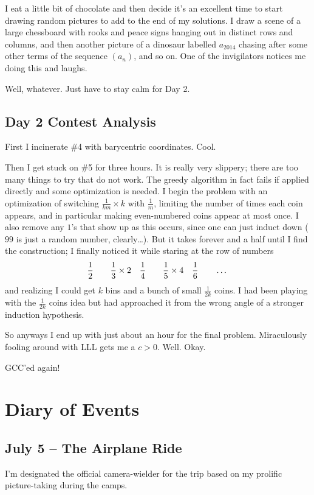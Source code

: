 \documentclass[11pt]{scrreprt}
\numberwithin{figure}{chapter}
\begin{document}
I eat a little bit of chocolate and then decide it's an excellent time to start drawing random pictures to add to the end of my solutions.
I draw a scene of a large chessboard with rooks and peace signs hanging out in distinct rows and columns, and then another picture of a dinosaur labelled $a_{2014}$ chasing after some other terms of the sequence $(a_n)$, and so on.
One of the invigilators notices me doing this and laughs.

Well, whatever. Just have to stay calm for Day 2.

\section{Day 2 Contest Analysis}
First I incinerate \#4 with barycentric coordinates.  Cool.

Then I get stuck on \#5 for three hours. It is really very slippery; there are too many things to try that do not work.
The greedy algorithm in fact fails if applied directly and some optimization is needed.
I begin the problem with an optimization of switching $\frac{1}{km} \times k$ with $\frac{1}{m}$, limiting the number of times each coin appears,
and in particular making even-numbered coins appear at most once.
I also remove any $1$'s that show up as this occurs, since one can just induct down ($99$ is just a random number, clearly\dots).
But it takes forever and a half until I find the construction; I finally noticed it while staring at the row of numbers
\[ \frac{1}{2} \qquad \frac 13 \times 2 \quad \frac 14 \qquad \frac 15 \times 4 \quad \frac 1 6 \qquad \dots \]
and realizing I could get $k$ bins and a bunch of small $\frac{1}{2k}$ coins.
I had been playing with the $\frac{1}{2k}$ coins idea but had approached it from the wrong angle of a stronger induction hypothesis.

So anyways I end up with just about an hour for the final problem.
Miraculously fooling around with LLL gets me a $c>0$. Well. Okay.

GCC'ed again!

\chapter{Diary of Events}
\section{July 5 -- The Airplane Ride}
I'm designated the official camera-wielder for the trip based on my prolific picture-taking during the camps.
\end{document}
